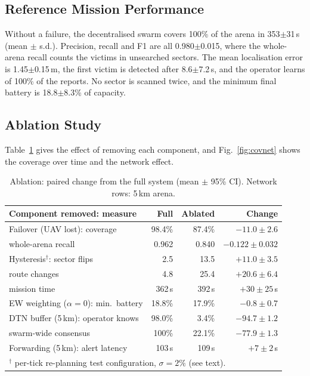 \documentclass[10pt,letterpaper]{article}
\newcommand{\pmsd}[2]{#1{\small$\pm$#2}}
\begin{document}
\subsection{Reference Mission Performance}
Without a failure, the decentralised swarm covers 100\% of the arena in \pmsd{353}{31}\,s (mean $\pm$ s.d.). Precision, recall and F1 are all \pmsd{0.980}{0.015}, where the whole-arena recall counts the victims in unsearched sectors. The mean localisation error is \pmsd{1.45}{0.15}\,m, the first victim is detected after \pmsd{8.6}{7.2}\,s, and the operator learns of 100\% of the reports. No sector is scanned twice, and the minimum final battery is \pmsd{18.8}{8.3}\% of capacity.

\subsection{Ablation Study}
Table~\ref{tab:abl} gives the effect of removing each component, and Fig.~\ref{fig:covnet} shows the coverage over time and the network effect.

\begin{table}[H]
\centering\small
\caption{Ablation: paired change from the full system (mean $\pm$ 95\% CI). Network rows: 5\,km arena.}\label{tab:abl}
\begin{tabular}{p{6.6cm}rrr}
\toprule
Component removed: measure & Full & Ablated & Change\\
\midrule
Failover (UAV lost): coverage & 98.4\% & 87.4\% & $-11.0\pm2.6$\\
\quad whole-arena recall & 0.962 & 0.840 & $-0.122\pm0.032$\\
Hysteresis$^\dagger$: sector flips & 2.5 & 13.5 & $+11.0\pm3.5$\\
\quad route changes & 4.8 & 25.4 & $+20.6\pm6.4$\\
\quad mission time & 362\,s & 392\,s & $+30\pm25$\,s\\
EW weighting ($\alpha{=}0$): min.\ battery & 18.8\% & 17.9\% & $-0.8\pm0.7$\\
DTN buffer (5\,km): operator knows & 98.0\% & 3.4\% & $-94.7\pm1.2$\\
\quad swarm-wide consensus & 100\% & 22.1\% & $-77.9\pm1.3$\\
Forwarding (5\,km): alert latency & 103\,s & 109\,s & $+7\pm2$\,s\\
\bottomrule
\multicolumn{4}{l}{\scriptsize $^\dagger$ per-tick re-planning test configuration, $\sigma=2\%$ (see text).}
\end{tabular}
\end{table}
\end{document}
